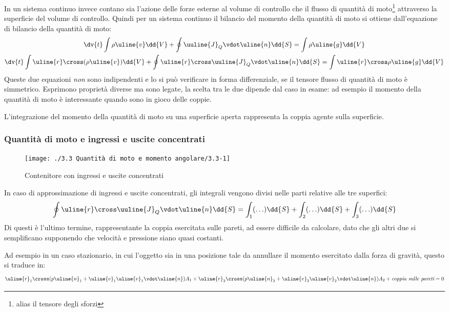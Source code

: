 In un sistema continuo invece contano sia l'azione delle forze esterne al volume di controllo che il flusso di quantità di moto\footnote{alias il tensore degli sforzi} attraverso la superficie del volume di controllo.
Quindi per un sistema continuo il bilancio del momento della quantità di moto si ottiene dall'equazione di bilancio della quantità di moto:
%
	\begin{equation*}
		\begin{gathered}
			\dv{t} \int \rho \uline{v} \dd{V} + \oint \uuline{J}_Q \vdot \uline{n} \dd{S} = \int \rho \uline{g} \dd{V} \\
			\dv{t} \int \uline{r} \cross (\rho \uline{v}) \dd{V} + \oint \uline{r} \cross \uuline{J}_Q \vdot \uline{n} \dd{S} = \int \uline{r} \cross \rho \uline{g} \dd{V}
		\end{gathered}
	\end{equation*}
%
Queste due equazioni \textit{non} sono indipendenti e lo si può verificare in forma differenziale, se il tensore flusso di quantità di moto è simmetrico.
Esprimono proprietà diverse ma sono legate, la scelta tra le due dipende dal caso in esame: ad esempio il momento della quantità di moto è interessante quando sono in gioco delle coppie.

L'integrazione del momento della quantità di moto su una superficie aperta rappresenta la coppia agente sulla superficie.

\subsubsection{Quantità di moto e ingressi e uscite concentrati}
%
	\begin{figure}[ht]
		\texttt{[image: ./3.3 Quantità di moto e momento angolare/3.3-1]}
		\centering
		\caption{Contenitore con ingressi e uscite concentrati}
	\end{figure}
In caso di approssimazione di ingressi e uscite concentrati, gli integrali vengono divisi nelle parti relative alle tre superfici:
%
	\begin{equation*}
		\oint \uline{r} \cross \uuline{J}_Q \vdot \uline{n} \dd{S} = \int_1 (\ldots) \dd{S} +  \int_2 (\ldots) \dd{S} +  \int_3 (\ldots) \dd{S}
	\end{equation*}
%
Di questi è l'ultimo termine, rappresentante la coppia esercitata sulle pareti, ad essere difficile da calcolare, dato che gli altri due si semplificano supponendo che velocità e pressione siano quasi costanti.

Ad esempio in un  caso stazionario, in cui l'oggetto sia in una posizione tale da annullare il momento esercitato dalla forza di gravità, questo si traduce in:
%
	\begin{equation*}
		\uline{r}_1 \cross (p \uline{n}_1 + \uline{v}_1 \uline{v}_1 \vdot \uline{n}) A_1 + \uline{r}_2 \cross (p \uline{n}_2 + \uline{v}_2 \uline{v}_2 \vdot \uline{n}) A_2 + \textit{coppia sulle pareti} = 0
	\end{equation*}

